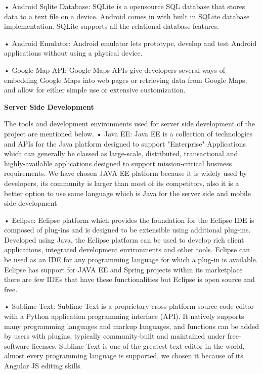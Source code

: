 • Android Sqlite Database: SQLite is a opensource SQL database that stores data to a text file on a device. Android comes in with built in SQLite database implementation. SQLite supports all the relational database features\cite{androidStudioSqlite}.
\newline

• Android Emulator: Android emulator lets prototype, develop and test Android applications without using a physical device\cite{androidEmulator}.
\newline

• Google Map API: Google Maps APIs give developers several ways of embedding Google Maps into web pages or retrieving data from Google Maps, and allow for either simple use or extensive customization\cite{googleMapAPI}.
\newline

\textbf{Server Side Development}

The tools and development environments used for server side development of the
project are mentioned below.
\newline
• Java EE: Java EE is a collection of technologies and APIs for the Java platform designed to support "Enterprise" Applications which can generally be classed as large-scale, distributed, transactional and highly-available applications designed to support mission-critical business requirements. \cite{javaEETanim}
We have chosen JAVA EE platform because it is widely used by developers, its community is larger than most of its competitors, also it is a better option to use same language which is Java for the server side and mobile side development


• Eclipse: Eclipse platform which provides the foundation for the Eclipse IDE is composed of plug-ins and is designed to be extensible using additional plug-ins. Developed using Java, the Eclipse platform can be used to develop rich client applications, integrated development environments and other tools. \cite{eclipseTanim}
Eclipse can be used as an IDE for any programming language for which a plug-in is available. Eclipse has support for JAVA EE and Spring projects within its marketplace there are few IDEs that have these functionalities but Eclipse is open source and free.


• Sublime Text: Sublime Text is a proprietary cross-platform source code editor with a Python application programming interface (API). It natively supports many programming languages and markup languages, and functions can be added by users with plugins, typically community-built and maintained under free-software licenses. \cite{sublimeTanim}
Sublime Text is one of the greatest text editor in the world, almost every programming language is supported, we chosen it because of its Angular JS editing skills.


